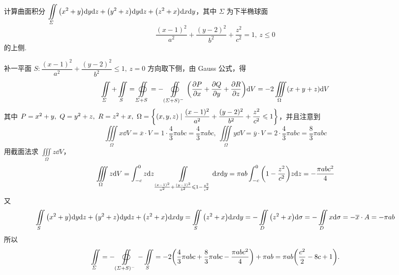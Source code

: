 \begin{example}
    计算曲面积分 $\displaystyle\iint\limits_\varSigma \qty(x^2+y)\dd y\dd z+\qty(y^2+z)\dd y\dd z+\qty(z^2+x)\dd x\dd y$，其中 $\varSigma$ 为下半椭球面
    $$\dfrac{(x-1)^2}{a^2}+\dfrac{(y-2)^2}{b^2}+\dfrac{z^2}{c^2}=1,~z\leqslant 0$$ 的上侧.
\end{example}
\begin{solution}
    补一平面 $S:\dfrac{(x-1)^2}{a^2}+\dfrac{(y-2)^2}{b^2}\leqslant 1,~z=0$ 方向取下侧，由 Gauss 公式，得
    $$\iint\limits_\varSigma+\iint\limits_S=\oiint\limits_{\varSigma+S}=-\oiint\limits_{(\varSigma+S)^-}\qty(\pdv{P}{x}+\pdv{Q}{y}+\pdv{R}{z})\dd V=-2\iiint\limits_{\Omega}(x+y+z)\dd V$$
    其中 $P=x^2+y,~Q=y^2+z,~R=z^2+x,~\Omega=\qty{(x,y,z)\mid \dfrac{(x-1)^2}{a^2}+\dfrac{(y-2)^2}{b^2}+\dfrac{z^2}{c^2}\leqslant 1}$，并且注意到
    $$\iiint\limits_\Omega x\dd V=\overline{x}\cdot V=1\cdot\dfrac{4}{3}\pi abc=\dfrac{4}{3}\pi abc,~\iiint\limits_{\Omega}y\dd V=\overline{y}\cdot V=2\cdot\dfrac{4}{3}\pi abc=\dfrac{8}{3}\pi abc$$
    用截面法求 $\displaystyle\iiint\limits_\Omega z\dd V$，
    $$\iiint\limits_\Omega z\dd V=\int_{-c}^{0}z\dd z\iint\limits_{\frac{(x-1)^2}{a^2}+\frac{(y-1)^2}{b^2}\leqslant 1-\frac{z^2}{c^2}}\dd x\dd y=\pi ab\int_{-c}^{0}\qty(1-\dfrac{z^2}{c^2})z\dd z=-\dfrac{\pi abc^2}{4}$$
    又 $$\iint\limits_{S}\qty(x^2+y)\dd y\dd z+\qty(y^2+z)\dd y\dd z+\qty(z^2+x)\dd x\dd y=\iint\limits_{S}\qty(z^2+x)\dd x\dd y=-\iint\limits_D\qty(z^2+x)\dd \sigma=-\iint\limits_Dx\dd \sigma=-\overline{x}\cdot A=-\pi ab$$
    所以 $$\iint\limits_\varSigma=-\oiint\limits_{(\varSigma+S)^-}-\iint\limits_S=-2\qty(\dfrac{4}{3}\pi abc+\dfrac{8}{3}\pi abc-\dfrac{\pi abc^2}{4})+\pi ab=\pi ab\qty(\dfrac{c^2}{2}-8c+1).$$
\end{solution}


